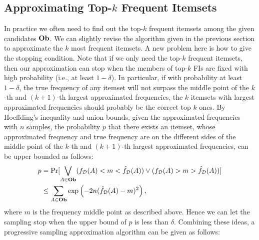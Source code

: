 \documentclass{article}
\begin{document}
\subsection{Approximating Top-$k$ Frequent Itemsets}
\label{sec:prg}
In practice we often need to find out the top-$k$ frequent itemsets among the given candidates $\mathbf{Ob}$. We can slightly revise the algorithm given in the previous section to approximate the $k$ most frequent itemsets. A new problem here is how to give the stopping condition. Note that if we only need the top-$k$ frequent itemsets, then our approximation can stop when the members of top-$k$ FIs are fixed with high probability (i.e., at least $1-\delta$). In particular, if with probability at least $1-\delta$, the true frequency of any itemset will not surpass the middle point of the $k$-th and $(k+1)$-th largest approximated frequencies, the $k$ itemsets with largest approximated frequencies should probably be the correct top $k$ ones. By Hoeffding's inequality and union bounds, given the approximated frequencies with $n$ samples, the probability $p$ that there exists an itemset, whose approximated frequency and true frequency are on the different sides of the middle point of the $k$-th and $(k+1)$-th largest approximated frequencies, can be upper bounded as follows: 
$$\begin{aligned}
p&=\Pr[\bigvee_{A\in\mathbf{Ob}} (f_{\mathcal{D}}(A) < m < \hat{f}_{\mathcal{D}}(A)) \vee (f_{\mathcal{D}}(A) > m > \hat{f}_{\mathcal{D}}(A)) ] \\
&\leq \sum_{A\in\mathbf{Ob}} \exp\left(-2n(\hat{f}_{\mathcal{D}}(A) - m)^2\right),
\end{aligned}$$
where $m$ is the frequency middle point as described above. 
Hence we can let the sampling stop when the upper bound of $p$ is less than $\delta$. 
Combining these ideas, a progressive sampling approximation algorithm can be given as follows:
\end{document}
